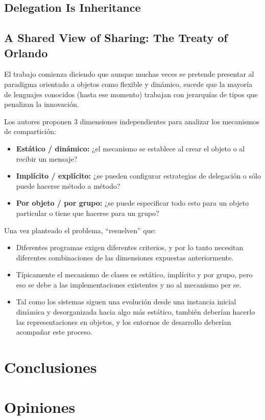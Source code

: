 \documentclass[a4paper,10pt]{article}
\newcommand{\strongitem}[1]{\item \textbf{#1:}}
\begin{document}
\subsection{Delegation Is Inheritance}

\subsection{A Shared View of Sharing: The Treaty of Orlando}
El trabajo comienza diciendo que aunque muchas veces se pretende presentar al paradigma orientado a objetos como flexible y dinámico, sucede que la mayoría de lenguajes conocidos (hasta ese momento) trabajan con jerarquías de tipos que penalizan la innovación.

Los autores proponen 3 dimensiones independientes para analizar los mecanismos de compartición:
\begin{itemize}
	\strongitem{Estático / dinámico} ¿el mecanismo se establece al crear el objeto o al recibir un mensaje?
	\strongitem{Implícito / explícito} ¿se pueden configurar estrategias de delegación o sólo puede hacerse método a método?
	\strongitem{Por objeto / por grupo} ¿se puede especificar todo esto para un objeto particular o tiene que hacerse para un grupo?
\end{itemize}

Una vez planteado el problema, ``resuelven'' que:
\begin{itemize}
	\item Diferentes programas exigen diferentes criterios, y por lo tanto necesitan diferentes combinaciones de las dimensiones expuestas anteriormente.
	\item Típicamente el mecanismo de clases es estático, implícito y por grupo, pero eso se debe a las implementaciones existentes y no al mecanismo per se.
	\item Tal como los sistemas siguen una evolución desde una instancia inicial dinámica y desorganizada hacia algo más estático, también deberían hacerlo las representaciones en objetos, y los entornos de desarrollo deberían acompañar este proceso.
\end{itemize}

\section{Conclusiones}

\section{Opiniones}

\printbibliography
\end{document}
